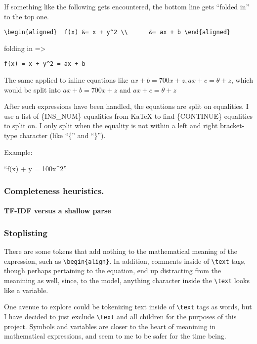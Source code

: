 \documentclass[]{article}
\let\oldparagraph\paragraph
\renewcommand{\paragraph}[1]{\oldparagraph{#1}\mbox{}}
\begin{document}
If something like the following gets encountered, the bottom line gets
``folded in'' to the top one.

\texttt{\textbackslash{}begin\{aligned\}\ \ f(x)\ \&=\ x\ +\ y\^{}2\ \textbackslash{}\textbackslash{}\ \ \ \ \ \ \&=\ ax\ +\ b\ \textbackslash{}end\{aligned\}}

folding in =\textgreater{}

\texttt{f(x)\ =\ x\ +\ y\^{}2\ =\ ax\ +\ b}

The same applied to inline equations like
\(ax + b = 700x + z, ax + c = \theta + z\), which would be split into
\(ax + b = 700x + z\) and \(ax + c = \theta + z\)

After such expressions have been handled, the equations are split on
equalities. I use a list of \{INS\_NUM\} equalities from KaTeX to find
\{CONTINUE\} equalities to split on. I only split when the equality is
not within a left and right bracket-type character (like ``\{'' and
``\}'').

Example:

``f(x) + y = 100x\^{}2''

\hypertarget{completeness-heuristics.}{%
\subsubsection{Completeness
heuristics.}\label{completeness-heuristics.}}

\hypertarget{tf-idf-versus-a-shallow-parse}{%
\paragraph{TF-IDF versus a shallow
parse}\label{tf-idf-versus-a-shallow-parse}}

\hypertarget{stoplisting}{%
\subsubsection{Stoplisting}\label{stoplisting}}

There are some tokens that add nothing to the mathematical meaning of
the expression, such as \texttt{\textbackslash{}begin\{align\}}. In
addition, comments inside of \texttt{\textbackslash{}text} tags, though
perhaps pertaining to the equation, end up distracting from the
meanining as well, since, to the model, anything character inside the
\texttt{\textbackslash{}text} looks like a variable.

One avenue to explore could be tokenizing text inside of
\texttt{\textbackslash{}text} tags as words, but I have decided to just
exclude \texttt{\textbackslash{}text} and all children for the purposes
of this project. Symbols and variables are closer to the heart of
meanining in mathematical expressions, and seem to me to be safer for
the time being.
\end{document}
